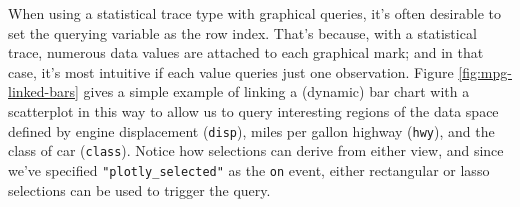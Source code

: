 \documentclass[
  12pt,
]{krantz}
\newenvironment{Shaded}{\begin{snugshade}}{\end{snugshade}}
\newcommand{\CommentTok}[1]{\textcolor[rgb]{0.56,0.35,0.01}{\textit{#1}}}
\newcommand{\DataTypeTok}[1]{\textcolor[rgb]{0.13,0.29,0.53}{#1}}
\newcommand{\KeywordTok}[1]{\textcolor[rgb]{0.13,0.29,0.53}{\textbf{#1}}}
\newcommand{\NormalTok}[1]{#1}
\newcommand{\OperatorTok}[1]{\textcolor[rgb]{0.81,0.36,0.00}{\textbf{#1}}}
\newcommand{\OtherTok}[1]{\textcolor[rgb]{0.56,0.35,0.01}{#1}}
\newcommand{\StringTok}[1]{\textcolor[rgb]{0.31,0.60,0.02}{#1}}
\begin{document}
When using a statistical trace type with graphical queries, it's often desirable to set the querying variable as the row index. That's because, with a statistical trace, numerous data values are attached to each graphical mark; and in that case, it's most intuitive if each value queries just one observation. Figure \ref{fig:mpg-linked-bars} gives a simple example of linking a (dynamic) bar chart with a scatterplot in this way to allow us to query interesting regions of the data space defined by engine displacement (\texttt{disp}), miles per gallon highway (\texttt{hwy}), and the class of car (\texttt{class}). Notice how selections can derive from either view, and since we've specified \texttt{"plotly\_selected"} as the \texttt{on} event, either rectangular or lasso selections can be used to trigger the query.

\begin{Shaded}
\end{Shaded}
\end{document}
